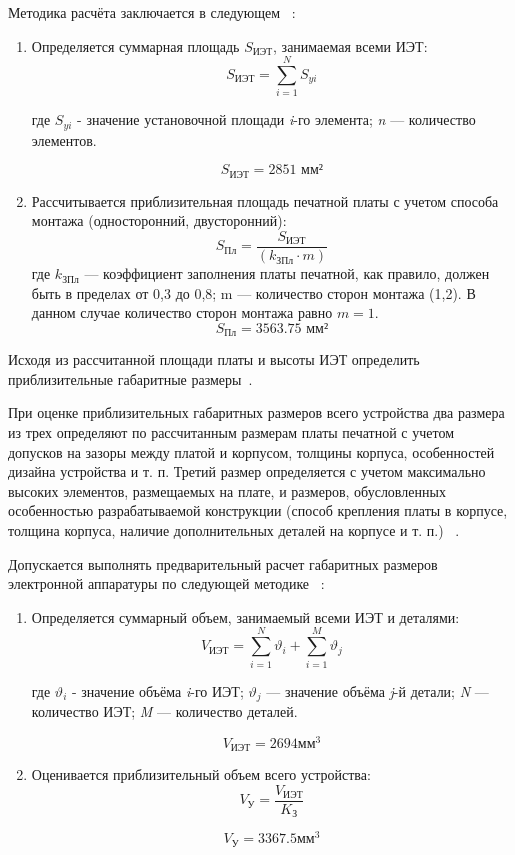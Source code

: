 Методика расчёта заключается в следующем ~\cite{Kostukevich2012}:
\begin{enumerate}
\item Определяется суммарная площадь $S_{\textrm{ИЭТ}}$, занимаемая всеми ИЭТ:
  \begin{equation}
    S_{\textrm{ИЭТ}} = \sum^N_{i=1}S_{yi}
  \end{equation}

  где $S_{yi}$ - значение установочной площади \textit{i}-го элемента;
  \textit{n} —  количество элементов.

  $$ S_{\textrm{ИЭТ}}= 2851 \textrm{ мм²}$$

\item Рассчитывается приблизительная площадь печатной платы с учетом
  способа монтажа (односторонний, двусторонний):
  \begin{equation}
    S_{\textrm{Пл}} = \frac{S_{\textrm{ИЭТ}}}{(k_{\textrm{ЗПл}} \cdot m)}
  \end{equation}
  где $k_{\textrm{ЗПл}}$ — коэффициент заполнения платы печатной, как правило,
  должен быть в пределах от 0,3 до 0,8;
  m — количество сторон монтажа (1,2).
  В данном случае количество сторон монтажа равно $m=1$.
  $$S_{\textrm{Пл}} = 3563.75 \textrm{ мм²}$$
\end{enumerate}


Исходя из рассчитанной площади платы и высоты ИЭТ определить
приблизительные габаритные размеры~\cite{Kostukevich2012}.

При оценке приблизительных габаритных размеров всего устройства два
размера из трех определяют по рассчитанным размерам платы печатной с
учетом допусков на зазоры между платой и корпусом, толщины корпуса,
особенностей дизайна устройства и т. п.
Третий размер определяется с учетом максимально высоких элементов,
размещаемых на плате, и размеров, обусловленных особенностью
разрабатываемой конструкции (способ крепления платы в корпусе,
толщина корпуса, наличие дополнительных деталей на корпусе и т. п.) ~\cite{Kostukevich2012}.

Допускается выполнять предварительный расчет габаритных размеров
электронной аппаратуры по следующей методике ~\cite{Kostukevich2012}:
\begin{enumerate}
\item Определяется суммарный объем, занимаемый всеми ИЭТ и деталями:
  \begin{equation}
    V_{\textit{ИЭТ}} = \sum^N_{i=1}\vartheta_i +   \sum^M_{i=1}\vartheta_j
  \end{equation}

где $\vartheta_i$ - значение объёма \textit{i}-го ИЭТ;
$\vartheta_j$ — значение объёма \textit{j}-й детали;
\textit{N} — количество ИЭТ;
\textit{M} — количество деталей.

$$V_{\textit{ИЭТ}} =  2694 \textrm{мм}^3$$
\item Оценивается приблизительный объем всего устройства:
  \begin{equation}
    V_{\textrm{У}} = \frac{V_{\textrm{ИЭТ}}}{K_{\textrm{З}}}
  \end{equation}

  $$V_{\textrm{У}} =3367.5 \textrm{мм}^3$$

\end{enumerate}

